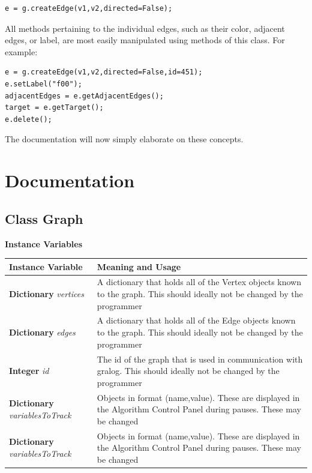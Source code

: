 \documentclass{article}
\newlength\q
\begin{document}
\begin{lstlisting}
e = g.createEdge(v1,v2,directed=False);
\end{lstlisting}

All methods pertaining to the individual edges, such as their color, adjacent edges, or label, are most easily manipulated using methods of this class. For example:

\begin{lstlisting}
e = g.createEdge(v1,v2,directed=False,id=451);
e.setLabel("f00");
adjacentEdges = e.getAdjacentEdges();
target = e.getTarget();
e.delete();
\end{lstlisting}

The documentation will now simply elaborate on these concepts.

\section{Documentation}

\subsection{Class Graph}

\textbf{{\large Instance Variables}}

\begin{table}[h]
\begin{tabular}{p{\q}p{\q}}
Instance Variable & Meaning and Usage \\ \hline
\textbf{Dictionary} \textit{vertices} & A dictionary that holds all of the Vertex objects known to the graph. This should ideally not be changed by the programmer \\\hline
\textbf{Dictionary} \textit{edges} & A dictionary that holds all of the Edge objects known to the graph. This should ideally not be changed by the programmer \\\hline
\textbf{Integer} \textit{id} & The id of the graph that is used in communication with gralog. This should ideally not be changed by the programmer \\ \hline
\textbf{Dictionary} \textit{variablesToTrack} & Objects in format (name,value). These are displayed in the Algorithm Control Panel during pauses. These may be changed \\ \hline
\textbf{Dictionary} \textit{variablesToTrack} & Objects in format (name,value). These are displayed in the Algorithm Control Panel during pauses. These may be changed \\ \hline
\end{tabular}
\end{table}
\end{document}
